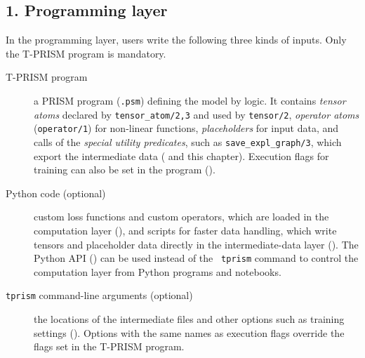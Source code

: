 \documentclass[a4paper]{report}
\begin{document}
\subsection*{1. Programming layer}
In the programming layer, users write the following three kinds of inputs.
Only the T-PRISM program is mandatory.
\begin{description}
	\item[T-PRISM program] a PRISM program ({\tt .psm}) defining the model by
	logic.  It contains {\em tensor atoms} declared by {\tt tensor\_atom/2,3} and
	used by {\tt tensor/2}, {\em operator atoms} ({\tt operator/1}) for
	non-linear functions, {\em placeholders} for input data, and calls of the
	{\em special utility predicates}, such as {\tt save\_expl\_graph/3}, which
	export the intermediate data ( and this chapter).
	Execution flags for training can also be set in the program
	().
	\item[Python code (optional)] custom loss functions and custom operators,
	which are loaded in the computation layer (), and
	scripts for faster data handling, which write tensors and placeholder data
	directly in the intermediate-data layer ().
	The Python API () can be used instead of the {\tt
		tprism} command to control the computation layer from Python programs and
	notebooks.
	\item[{\tt tprism} command-line arguments (optional)] the locations of the
	intermediate files and other options such as training settings
	().  Options with the same names as execution
	flags override the flags set in the T-PRISM program.
\end{description}
\end{document}

